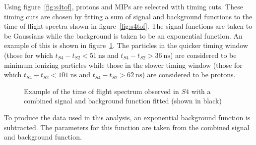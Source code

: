 Using figure~\ref{fig:s4tof}, protons and MIPs are selected with timing cuts. 
These timing cuts are chosen by fitting a sum of signal and background functions to the time of flight spectra shown in figure~\ref{fig:s4tof}. 
The signal functions are taken to be Gaussians while the background is taken to be an exponential function. 
An example of this is shown in figure~\ref{fig:fitEx}.
The particles in the quicker timing window (those for which $t_{\mathit{S4}}-t_{\mathit{S2}}<51~\text{ns}$ and $t_{\mathit{S4}}-t_{\mathit{S2}}>36~\text{ns}$) are considered to be minimum ionizing particles while those in the slower timing window (those for which $t_{\mathit{S4}}-t_{\mathit{S2}}<101~\text{ns}$ and $t_{\mathit{S4}}-t_{\mathit{S2}}>62~\text{ns}$) are considered to be protons.

\begin{figure}[h]
  \begin{adjustbox}{max totalsize={.7\textwidth}{.62\textheight},center}
    
  \end{adjustbox}
  \caption{Example of the time of flight spectrum observed in $\mathit{S4}$ with a combined signal and background function fitted (shown in black)}
  \label{fig:fitEx}
\end{figure}

To produce the data used in this analysis, an exponential background function is subtracted. 
The parameters for this function are taken from the combined signal and background function.


